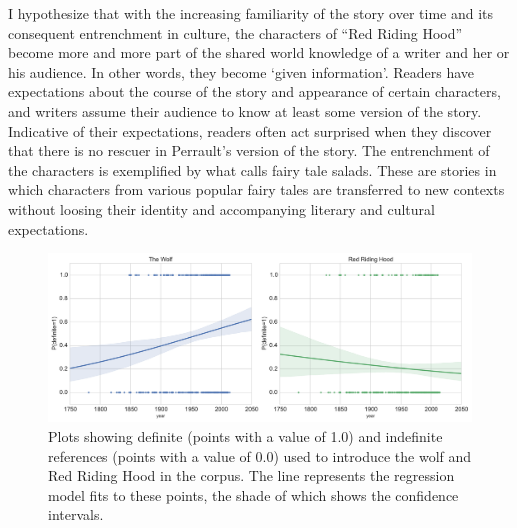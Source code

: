 I hypothesize that with the increasing familiarity of the story over time and its consequent entrenchment in culture\autocite[Cf.][]{beckett:2002}, the characters of ``Red Riding Hood'' become more and more part of the shared world knowledge of a writer and her or his audience. In other words, they become `given information'. Readers have expectations about the course of the story and appearance of certain characters, and writers assume their audience to know at least some version of the story. Indicative of their expectations, readers often act surprised when they discover that there is no rescuer in Perrault's version of the story. The entrenchment of the characters is exemplified by what \citeauthor{beckett:2002} calls fairy tale salads\autocite[Cf.\ chapter 7 in][]{beckett:2002}. These are stories in which characters from various popular fairy tales are transferred to new contexts without loosing their identity and accompanying literary and cultural expectations.

\begin{figure}
\centering
\includegraphics[width=\textwidth]{images/definite}
\caption{Plots showing definite (points with a value of 1.0) and indefinite references (points with a value of 0.0) used to introduce the wolf and Red Riding Hood in the corpus. The line represents the regression model fits to these points, the shade of which shows the confidence intervals.}
\label{fig:definite}
\end{figure}


